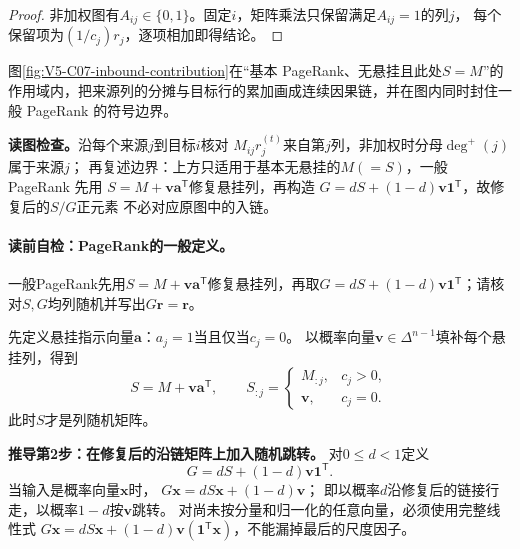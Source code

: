 \begin{proof}
非加权图有$A_{ij}\in\{0,1\}$。固定$i$，矩阵乘法只保留满足$A_{ij}=1$的列$j$，
每个保留项为$(1/c_j)r_j$，逐项相加即得结论。
\end{proof}
图\ref{fig:V5-C07-inbound-contribution}在“基本 PageRank、无悬挂且此处$S=M$”的作用域内，把来源列的分摊与目标行的累加画成连续因果链，并在图内同时封住一般 PageRank 的符号边界。

\FloatBarrier
\noindent\textbf{读图检查。}沿每个来源$j$到目标$i$核对
$M_{ij}r_j^{(t)}$来自第$j$列，非加权时分母$\deg^+(j)$属于来源$j$；
再复述边界：上方只适用于基本无悬挂的$M(=S)$，一般 PageRank 先用
$S=M+\boldsymbol v\boldsymbol a^{\mathsf T}$修复悬挂列，再构造
$G=dS+(1-d)\boldsymbol v\boldsymbol1^{\mathsf T}$，故修复后的$S/G$正元素
不必对应原图中的入链。

\paragraph{读前自检：PageRank的一般定义。}一般PageRank先用$S=M+\boldsymbol v\boldsymbol a^{\mathsf T}$修复悬挂列，再取$G=dS+(1-d)\boldsymbol v\boldsymbol1^{\mathsf T}$；请核对$S,G$均列随机并写出$G\boldsymbol r=\boldsymbol r$。\par


先定义悬挂指示向量$\boldsymbol a$：$a_j=1$当且仅当$c_j=0$。
以概率向量$\boldsymbol v\in\Delta^{n-1}$填补每个悬挂列，得到
\begin{equation}
S=M+\boldsymbol v\boldsymbol a^{\mathsf T},
\qquad
S_{:j}=\begin{cases}M_{:j},&c_j>0,\\ \boldsymbol v,&c_j=0.\end{cases}
\label{eq:V5-C07-dangling-repair}
\end{equation}
此时$S$才是列随机矩阵。

\textbf{推导第2步：在修复后的沿链矩阵上加入随机跳转。}
对$0\le d<1$定义
\begin{equation}
G=dS+(1-d)\boldsymbol v\boldsymbol1^{\mathsf T}.
\label{eq:V5-C07-google-matrix}
\end{equation}
当输入是概率向量$\boldsymbol x$时，
$G\boldsymbol x=dS\boldsymbol x+(1-d)\boldsymbol v$；
即以概率$d$沿修复后的链接行走，以概率$1-d$按$\boldsymbol v$跳转。
对尚未按分量和归一化的任意向量，必须使用完整线性式
$G\boldsymbol x=dS\boldsymbol x+(1-d)\boldsymbol v
(\boldsymbol1^{\mathsf T}\boldsymbol x)$，不能漏掉最后的尺度因子。

